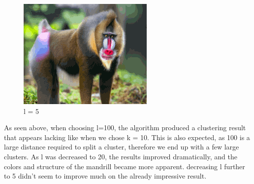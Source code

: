 \documentclass[12pt]{article}
\begin{document}
\begin{figure}[!h]
        \begin{minipage}{0.5\textwidth}
        \centering
        \includegraphics[]{images/monkey_clustered_pdc_dp_means_l_5}
        \caption{l = 5}
        \end{minipage}\label{fig:figure8}
	\end{figure}
    As seen above, when choosing l=100, the algorithm produced a clustering result that appears lacking like when we chose k = 10.
    This is also expected, as 100 is a large distance required to split a cluster, therefore we end up with a few large clusters.
    As l was decreased to 20, the results improved dramatically, and the colors and structure of the mandrill became more apparent.
    decreasing l further to 5 didn't seem to improve much on the already impressive result.
\end{document}
